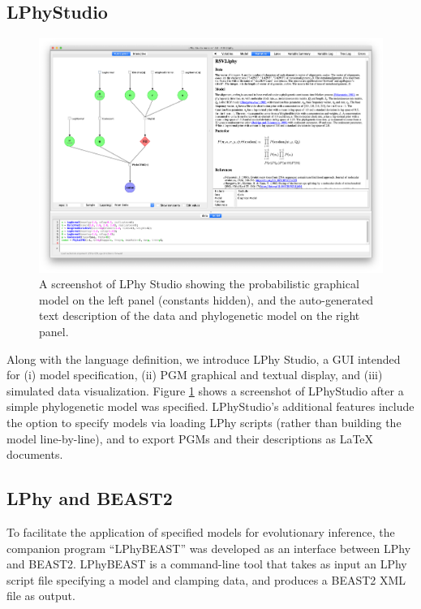 \documentclass[10pt,letterpaper,table]{article}
\begin{document}
\subsection{LPhyStudio} 
\begin{figure}[!h]
  \includegraphics[width=\textwidth]{figs_plos/lphystudio_screenshot.png}
  \caption{A screenshot of LPhy Studio showing the probabilistic graphical model 
  on the left panel (constants hidden), and the auto-generated text description of the data and phylogenetic model on the right panel.} 
  \label{fig:lphystudio}
\end{figure}
Along with the language definition, we introduce LPhy Studio, a GUI intended for (i) model specification, (ii) PGM graphical and textual display, and (iii) simulated data visualization.
Figure \ref{fig:lphystudio} shows a screenshot of LPhyStudio after a simple phylogenetic model was specified. LPhyStudio's additional features include the option to specify models via loading LPhy scripts (rather than building the model line-by-line), and to export PGMs and their descriptions as LaTeX documents.

\subsection{LPhy and BEAST2}
\label{sec:lphybeast}
To facilitate the application of specified models for evolutionary inference, the companion program ``LPhyBEAST'' was developed as an interface between LPhy and BEAST2.
LPhyBEAST is a command-line tool that takes as input an LPhy script file specifying a model and clamping data, and produces a BEAST2 XML file as output.
\end{document}
